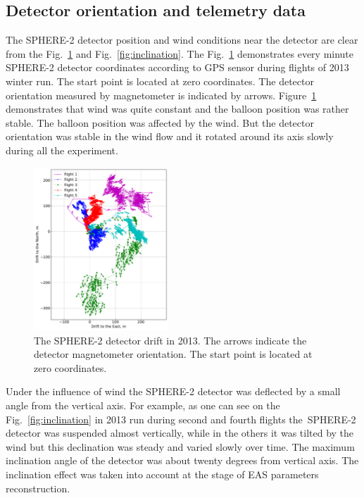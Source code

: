 \documentclass[final,5p,times,twocolumn]{elsarticle}
\begin{document}
\subsection{Detector orientation and telemetry data\label{sect:telemetrydata}}

The \mbox{SPHERE-2} detector position and wind conditions near the detector are clear from the Fig.~\ref{fig:gps_compass} and Fig.~\ref{fig:inclination}. The Fig.~\ref{fig:gps_compass} demonstrates every minute \mbox{SPHERE-2} detector coordinates according to GPS sensor during flights of 2013 winter run. The start point is located at zero coordinates. The detector orientation measured by magnetometer is indicated by arrows. Figure~\ref{fig:gps_compass} demonstrates that wind was quite constant and the balloon position was rather stable. The balloon position was affected by the wind. But the detector orientation was stable in the wind flow and it rotated around its axis slowly during all the experiment.  

\begin{figure}[tb]
    \includegraphics[width=0.45\textwidth]{figs/GPS+quiver.pdf}\hspace{2pc}%
    \caption{The SPHERE-2 detector drift in 2013. The arrows indicate the detector magnetometer orientation. The start point is located at zero coordinates.}
\label{fig:gps_compass}
\end{figure}

Under the influence of wind the SPHERE-2 detector was deflected by a small angle from the vertical axis. For example, as one can see on the Fig.~\ref{fig:inclination} in 2013 run during second and fourth flights the~\mbox{SPHERE-2} detector was suspended almost vertically, while in the others it was tilted by the wind but this declination was steady and varied slowly over time. The maximum inclination angle of the detector was about twenty degrees from vertical axis. The inclination effect was taken into account at the stage of EAS parameters reconstruction.
\end{document}

